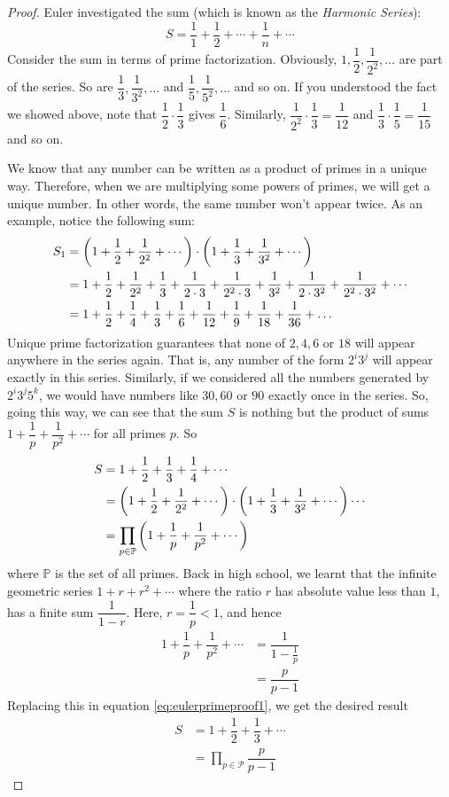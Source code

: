 	\begin{proof}
		Euler investigated the sum (which is known as the \textit{Harmonic Series}):
		\[S=\dfrac11+\dfrac12+\cdots+\dfrac1n+\cdots\]
		Consider the sum in terms of prime factorization. Obviously, $1,\dfrac12,\dfrac1{2^2},\ldots$ are part of the series. So are $\dfrac13,\dfrac1{3^2},\ldots$ and $\dfrac15,\dfrac1{5^2},\ldots$ and so on. If you understood the fact we showed above, note that $\dfrac12\cdot\dfrac13$ gives $\dfrac16$. Similarly, $\dfrac1{2^2}\cdot\dfrac13=\dfrac1{12}$ and $\dfrac13\cdot\dfrac15=\dfrac1{15}$ and so on.

		We know that any number can be written as a product of primes in a unique way. Therefore, when we are multiplying some powers of primes, we will get a unique number. In other words, the same number won't appear twice. As an example, notice the following sum:
			\begin{align*}
				S_1 & =  \left(1+\dfrac12+\dfrac1{2^2}+\cdots\right)\cdot\left(1+\dfrac13+\dfrac1{3^2}+\cdots\right)\\
				& =  1+\dfrac12+\dfrac1{2^2}+\dfrac13+\dfrac1{2\cdot3}+\dfrac1{2^2\cdot3}+\dfrac1{3^2}+\dfrac1{2\cdot3^2}+\dfrac1{2^2\cdot3^2}+\cdots\\
				& =  1+\dfrac12+\dfrac14+\dfrac13+\dfrac16+\dfrac1{12}+\dfrac19+\dfrac1{18}+\dfrac1{36}+\ldots
			\end{align*}
		Unique prime factorization guarantees that none of $2,4,6$ or $18$ will appear anywhere in the series again. That is, any number of the form $2^i3^j$ will appear exactly in this series. Similarly, if we considered all the numbers generated by $2^i3^j5^k$, we would have numbers like $30, 60$ or $90$ exactly once in the series. So, going this way, we can see that the sum $S$ is nothing but the product of sums $1+\dfrac1p+\dfrac1{p^2}+\cdots$ for all primes $p$. So
			\begin{align}
				S	& =  1+\dfrac12+\dfrac13+\dfrac14+\cdots\nonumber\\
					& =  \left(1+\dfrac12+\dfrac1{2^2}+\cdots\right)\cdot\left(1+\dfrac13+\dfrac1{3^2}+\cdots\right) \cdots\nonumber\\
					& = \prod_{p\in\mathbb P}\left(1+\dfrac1p+\dfrac1{p^2}+\cdots\right)\label{eq:eulerprimeproof1}
			\end{align}
		where $\mathbb P$ is the set of all primes. Back in high school, we learnt that the infinite geometric series $1+r+r^2+\cdots$ where the ratio $r$ has absolute value less than $1$, has a finite sum $\dfrac1{1-r}$. Here, $r=\dfrac1p<1$, and hence
			\begin{align*}
				1+\dfrac1p+\dfrac1{p^2}+\cdots  & =\dfrac1{1-\frac1p}\\
											&=\dfrac p{p-1}
			\end{align*}
		Replacing this in equation \eqref{eq:eulerprimeproof1}, we get the desired result
			\begin{align*}
				S   & = 1+\dfrac12+\dfrac13+\cdots\\
					& =\prod_{p\in\mathcal P}\dfrac p{p-1}
			\end{align*}
	\end{proof}
